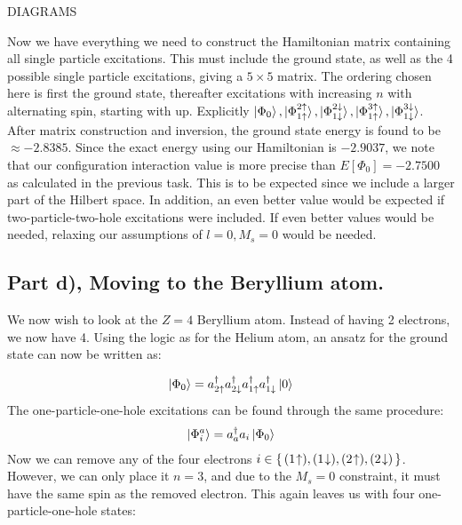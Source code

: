 \documentclass{article}
\newcommand{\vac}{\ket{0}}
\newcommand{\gs}{\ket{\Phi_0}}
\newcommand{\exed}[2]{\ket{\Phi_{#1}^{#2}}}
\newcommand{\ups}[1]{#1\uparrow}
\newcommand{\downs}[1]{#1\downarrow}
\newcommand{\upst}[1]{#1\hspace{-2px}\uparrow}
\newcommand{\downst}[1]{#1\hspace{-2px}\downarrow}
\newcommand{\crt}[1]{a_{#1}^{\dagger}}
\newcommand{\ani}[1]{a_{#1}}
\begin{document}
    DIAGRAMS

    Now we have everything we need to construct the Hamiltonian matrix containing all single particle excitations. This must include the ground state, as well as the 4 possible single particle excitations, giving a $5 \times 5$ matrix. The ordering chosen here is first the ground state, thereafter excitations with increasing $n$ with alternating spin, starting with up. Explicitly $\gs,\exed{\ups{1}}{\ups{2}}, \exed{\downs{1}}{\downs{2}}, \exed{\ups{1}}{\ups{3}}, \exed{\downs{1}}{\downs{3}}$. After matrix construction and inversion, the ground state energy is found to be $\approx -2.8385$. Since the exact energy using our Hamiltonian is $-2.9037$, we note that our configuration interaction value is more precise than $E[\Phi_0] = -2.7500$ as calculated in the previous task. This is to be expected since we include a larger part of the Hilbert space. In addition, an even better value would be expected if two-particle-two-hole excitations were included. If even better values would be needed, relaxing our assumptions of $l=0, M_s = 0$ would be needed.     

\subsection*{Part d), Moving to the Beryllium atom.}
    We now wish to look at the $Z = 4$ Beryllium atom. Instead of having 2 electrons, we now have 4. Using the logic as for the Helium atom, an ansatz for the ground state can now be written as:

    \begin{align*}
        \gs = \crt{\ups{2}}\crt{\downs{2}}\crt{\ups{1}}\crt{\downs{1}} \vac       
    \end{align*}
    The one-particle-one-hole excitations can be found through the same procedure:
    \begin{align*}
        \exed{i}{a} = \crt{a}\ani{i}\gs
    \end{align*}
    Now we can remove any of the four electrons $i \in \set{(\upst{1}), (\downst{1}), (\upst{2}), (\downst{2})}$. However, we can only place it $n = 3$, and due to the $M_s = 0$ constraint, it must have the same spin as the removed electron. This again leaves us with four one-particle-one-hole states:
    
\end{document}

